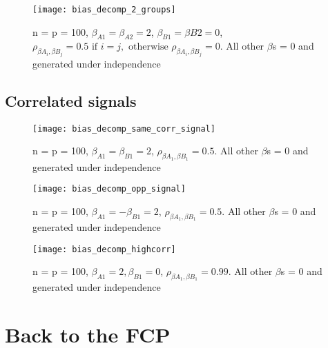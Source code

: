 \begin{figure}[hbtp]
    \begin{center}
    \texttt{[image: bias\_decomp\_2\_groups]}
    \caption{\label{Fig:bias_decomp_2_groups} n = p = 100, $\beta_{A1} = \beta_{A2} = 2$, $\beta_{B1} = \beta{B2} = 0$, $\rho_{\beta{A_i},\beta{B_j}} = 0.5 \text{ if } i=j, \text{ otherwise } \rho_{\beta{A_i},\beta{B_j}} = 0$.  All other $\beta$s = 0 and  generated under independence}
    \end{center}
\end{figure}

\subsection{Correlated signals}

\begin{figure}[hbtp]
    \begin{center}
    \texttt{[image: bias\_decomp\_same\_corr\_signal]}
    \caption{\label{Fig:bias_decomp_same_corr_signal} n = p = 100, $\beta_{A1} = \beta_{B1} = 2$, $\rho_{\beta{A_1},\beta{B_1}} = 0.5$.  All other $\beta$s = 0 and  generated under independence}
    \end{center}
\end{figure}

\begin{figure}[hbtp]
    \begin{center}
    \texttt{[image: bias\_decomp\_opp\_signal]}
    \caption{\label{Fig:bias_decomp_opp_signal} n = p = 100, $\beta_{A1} = -\beta_{B1} = 2$, $\rho_{\beta{A_1},\beta{B_1}} = 0.5$.  All other $\beta$s = 0 and  generated under independence}
    \end{center}
\end{figure}

\begin{figure}[hbtp]
    \begin{center}
    \texttt{[image: bias\_decomp\_highcorr]}
    \caption{\label{Fig:bias_decomp_highcorr} n = p = 100, $\beta_{A1} = 2, \beta_{B1} = 0$, $\rho_{\beta{A_1},\beta{B_1}} = 0.99$.  All other $\beta$s = 0 and  generated under independence}
    \end{center}
\end{figure}


\section{Back to the FCP}

